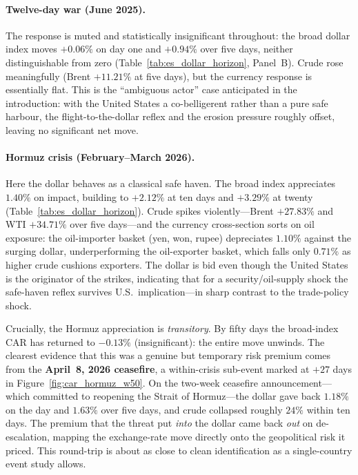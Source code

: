 \paragraph{Twelve-day war (June 2025).}
The response is muted and statistically insignificant throughout: the broad dollar index
moves $+0.06\%$ on day one and $+0.94\%$ over five days, neither distinguishable from
zero (Table~\ref{tab:es_dollar_horizon}, Panel~B). Crude rose meaningfully (Brent
$+11.21\%$ at five days), but the currency response is essentially flat. This is the
``ambiguous actor'' case anticipated in the introduction: with the United States a
co-belligerent rather than a pure safe harbour, the flight-to-the-dollar reflex and the
erosion pressure roughly offset, leaving no significant net move.

\paragraph{Hormuz crisis (February--March 2026).}
Here the dollar behaves as a classical safe haven. The broad index appreciates $1.40\%$
on impact, building to $+2.12\%$ at ten days and $+3.29\%$ at twenty
(Table~\ref{tab:es_dollar_horizon}). Crude spikes violently---Brent $+27.83\%$ and WTI
$+34.71\%$ over five days---and the currency cross-section sorts on oil exposure: the
oil-importer basket (yen, won, rupee) depreciates $1.10\%$ against the surging dollar,
underperforming the oil-exporter basket, which falls only $0.71\%$ as higher crude
cushions exporters. The dollar is bid even though the United States is the originator of
the strikes, indicating that for a security/oil-supply shock the safe-haven reflex
survives U.S.\ implication---in sharp contrast to the trade-policy shock.

Crucially, the Hormuz appreciation is \emph{transitory}. By fifty days the broad-index
CAR has returned to $-0.13\%$ (insignificant): the entire move unwinds. The clearest
evidence that this was a genuine but temporary risk premium comes from the
\textbf{April~8, 2026 ceasefire}, a within-crisis sub-event marked at $+27$ days in
Figure~\ref{fig:car_hormuz_w50}. On the two-week ceasefire announcement---which committed
to reopening the Strait of Hormuz---the dollar gave back $1.18\%$ on the day and $1.63\%$
over five days, and crude collapsed roughly $24\%$ within ten days. The premium that the
threat put \emph{into} the dollar came back \emph{out} on de-escalation, mapping the
exchange-rate move directly onto the geopolitical risk it priced. This round-trip is
about as close to clean identification as a single-country event study allows.


